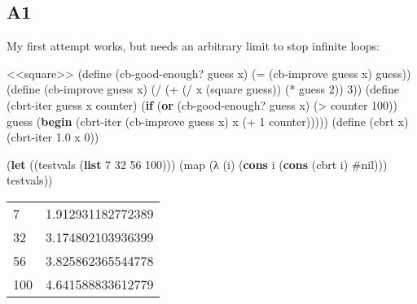 \documentclass[
]{article}
\newenvironment{Shaded}{}{}
\newcommand{\DecValTok}[1]{\textcolor[rgb]{0.25,0.63,0.44}{#1}}
\newcommand{\ExtensionTok}[1]{#1}
\newcommand{\FloatTok}[1]{\textcolor[rgb]{0.25,0.63,0.44}{#1}}
\newcommand{\FunctionTok}[1]{\textcolor[rgb]{0.02,0.16,0.49}{#1}}
\newcommand{\KeywordTok}[1]{\textcolor[rgb]{0.00,0.44,0.13}{\textbf{#1}}}
\newcommand{\NormalTok}[1]{#1}
\newcommand{\OperatorTok}[1]{\textcolor[rgb]{0.40,0.40,0.40}{#1}}
\begin{document}
\hypertarget{a1}{%
\subsection{A1}\label{a1}}

My first attempt works, but needs an arbitrary limit to stop infinite
loops:

\hypertarget{EX1-8-A1}{%
\label{EX1-8-A1}}%
\begin{Shaded}
\begin{Highlighting}[]
\NormalTok{\textless{}\textless{}square\textgreater{}\textgreater{}}
\NormalTok{(}\ExtensionTok{define}\FunctionTok{ }\NormalTok{(cb{-}good{-}enough? guess x)}
\NormalTok{  (}\OperatorTok{=}\NormalTok{ (cb{-}improve guess x) guess))}
\NormalTok{(}\ExtensionTok{define}\FunctionTok{ }\NormalTok{(cb{-}improve guess x)}
\NormalTok{  (}\OperatorTok{/}
\NormalTok{   (}\OperatorTok{+}
\NormalTok{    (}\OperatorTok{/}\NormalTok{ x (square guess))}
\NormalTok{    (}\OperatorTok{*}\NormalTok{ guess }\DecValTok{2}\NormalTok{))}
   \DecValTok{3}\NormalTok{))}
\NormalTok{(}\ExtensionTok{define}\FunctionTok{ }\NormalTok{(cbrt{-}iter guess x counter)}
\NormalTok{  (}\KeywordTok{if}\NormalTok{ (}\KeywordTok{or}\NormalTok{ (cb{-}good{-}enough? guess x) (}\OperatorTok{\textgreater{}}\NormalTok{ counter }\DecValTok{100}\NormalTok{))}
\NormalTok{      guess}
\NormalTok{      (}\KeywordTok{begin}
\NormalTok{        (cbrt{-}iter (cb{-}improve guess x) x (}\OperatorTok{+} \DecValTok{1}\NormalTok{ counter)))))}
\NormalTok{(}\ExtensionTok{define}\FunctionTok{ }\NormalTok{(cbrt x)}
\NormalTok{  (cbrt{-}iter }\FloatTok{1.0}\NormalTok{ x }\DecValTok{0}\NormalTok{))}

\NormalTok{(}\KeywordTok{let}\NormalTok{ ((testvals (}\KeywordTok{list} \DecValTok{7} \DecValTok{32} \DecValTok{56} \DecValTok{100}\NormalTok{)))}
\NormalTok{      (map (λ (i) (}\KeywordTok{cons}\NormalTok{ i (}\KeywordTok{cons}\NormalTok{ (cbrt i) \#nil))) testvals))}
\end{Highlighting}
\end{Shaded}

\begin{longtable}[]{@{}ll@{}}
\toprule
\endhead
7 & 1.912931182772389 \\
32 & 3.174802103936399 \\
56 & 3.825862365544778 \\
100 & 4.641588833612779 \\
\bottomrule
\end{longtable}
\end{document}
